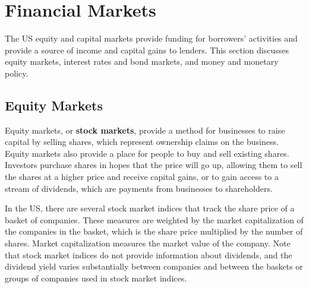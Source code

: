 \documentclass{report}
\begin{document}
{\section*{Financial Markets}
\begin{minipage}{0.76\textwidth}
\vspace{-1mm}
\small The US equity and capital markets provide funding for borrowers' activities and provide a source of income and capital gains to lenders. This section discusses equity markets, interest rates and bond markets, and money and monetary policy. 
\hypertarget{capeq}{}
\subsection*{Equity Markets}
\small Equity markets, or \textbf{stock markets}, provide a method for businesses to raise capital by selling shares, which represent ownership claims on the business. Equity markets also provide a place for people to buy and sell existing shares. Investors purchase shares in hopes that the price will go up, allowing them to sell the shares at a higher price and receive capital gains, or to gain access to a stream of dividends, which are payments from businesses to shareholders. 

In the US, there are several stock market indices that track the share price of a basket of companies. These measures are weighted by the market capitalization of the companies in the basket, which is the share price multiplied by the number of shares. Market capitalization measures the market value of the company. Note that stock market indices do not provide information about dividends, and the dividend yield varies substantially between companies and between the baskets or groups of companies used in stock market indices.
\vspace{2mm}


\end{minipage}}
\end{document}
